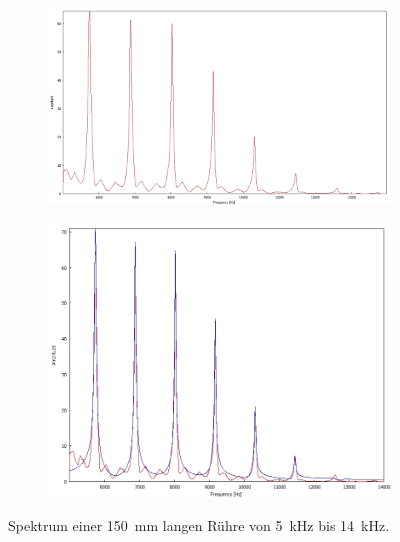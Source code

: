 \begin{figure}
\centering
\begin{subfigure}{0.4\textwidth}
\vspace{0.8cm}
\includegraphics[width=\textwidth]{content/messungen/Chapter1/1-2img.jpg}
\label{fig:1-2a:a}
\end{subfigure}
\begin{subfigure}{0.4\textwidth}
\includegraphics[width=\textwidth]{content/messungen/Chapter1/fit_img1.jpg}
\label{fig:1-2a:b}
\end{subfigure}
\caption{Spektrum einer 150~mm langen Rühre von 5~kHz bis 14~kHz.}
\label{fig:1-2a}
\end{figure}


